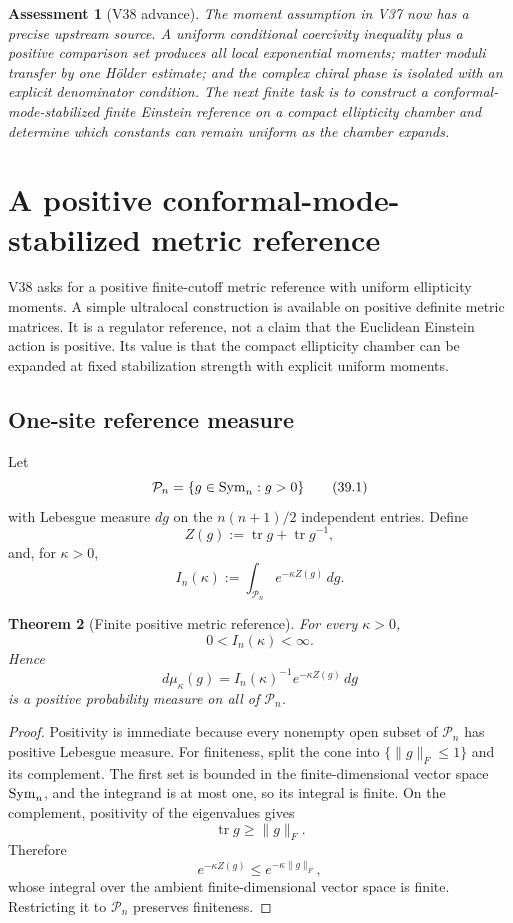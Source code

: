 \documentclass[11pt]{article}
\newtheorem{theorem}{Theorem}[section]
\newtheorem{assessment}[theorem]{Assessment}
\begin{document}
\begin{assessment}[V38 advance]
\label{ass:v11v38}
The moment assumption in V37 now has a precise upstream source.  A
uniform conditional coercivity inequality plus a positive comparison
set produces all local exponential moments; matter moduli transfer by
one Hölder estimate; and the complex chiral phase is isolated with an
explicit denominator condition.  The next finite task is to construct
a conformal-mode-stabilized finite Einstein reference on a compact
ellipticity chamber and determine which constants can remain uniform
as the chamber expands.
\end{assessment}
\section{A positive conformal-mode-stabilized metric reference}
\label{sec:v11v39}

V38 asks for a positive finite-cutoff metric reference with uniform
ellipticity moments.  A simple ultralocal construction is available on
positive definite metric matrices.  It is a regulator reference, not a
claim that the Euclidean Einstein action is positive.  Its value is that
the compact ellipticity chamber can be expanded at fixed stabilization
strength with explicit uniform moments.

\subsection{One-site reference measure}

Let
\[
 \mathcal P_n=\{g\in{\rm Sym}_n:g>0\}
 \tag{39.1}
\]
with Lebesgue measure \(dg\) on the
\(n(n+1)/2\) independent entries.  Define
\[
 Z(g):=\operatorname{tr}g+\operatorname{tr}g^{-1},
 \tag{39.2}
\]
and, for \(\kappa>0\),
\[
 I_n(\kappa):=
 \int_{\mathcal P_n}e^{-\kappa Z(g)}\,dg.
 \tag{39.3}
\]

\begin{theorem}[Finite positive metric reference]
\label{thm:v11v39-reference}
For every \(\kappa>0\),
\[
 0<I_n(\kappa)<\infty.
 \tag{39.4}
\]
Hence
\[
 d\mu_\kappa(g)
 =
 I_n(\kappa)^{-1}e^{-\kappa Z(g)}\,dg
 \tag{39.5}
\]
is a positive probability measure on all of \(\mathcal P_n\).
\end{theorem}

\begin{proof}
Positivity is immediate because every nonempty open subset of
\(\mathcal P_n\) has positive Lebesgue measure.  For finiteness, split
the cone into
\(\{\|g\|_F\leq1\}\) and its complement.  The first set is bounded in
the finite-dimensional vector space \({\rm Sym}_n\), and the integrand
is at most one, so its integral is finite.  On the complement, positivity
of the eigenvalues gives
\[
 \operatorname{tr}g\geq\|g\|_F.
\]
Therefore
\[
 e^{-\kappa Z(g)}
 \leq e^{-\kappa\|g\|_F},
\]
whose integral over the ambient finite-dimensional vector space is
finite.  Restricting it to \(\mathcal P_n\) preserves finiteness.
\end{proof}
\end{document}
